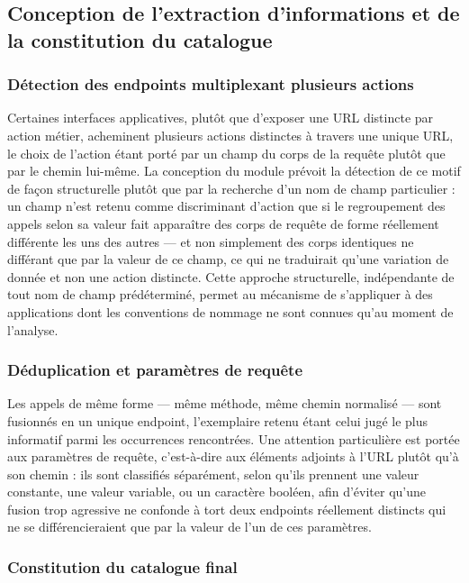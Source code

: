 \subsection{Conception de l'extraction d'informations et de la constitution du catalogue}

\subsubsection{Détection des endpoints multiplexant plusieurs actions}

Certaines interfaces applicatives, plutôt que d'exposer une URL distincte par action métier, acheminent plusieurs actions distinctes à travers une unique URL, le choix de l'action étant porté par un champ du corps de la requête plutôt que par le chemin lui-même. La conception du module prévoit la détection de ce motif de façon structurelle plutôt que par la recherche d'un nom de champ particulier : un champ n'est retenu comme discriminant d'action que si le regroupement des appels selon sa valeur fait apparaître des corps de requête de forme réellement différente les uns des autres — et non simplement des corps identiques ne différant que par la valeur de ce champ, ce qui ne traduirait qu'une variation de donnée et non une action distincte. Cette approche structurelle, indépendante de tout nom de champ prédéterminé, permet au mécanisme de s'appliquer à des applications dont les conventions de nommage ne sont connues qu'au moment de l'analyse.

\subsubsection{Déduplication et paramètres de requête}

Les appels de même forme — même méthode, même chemin normalisé — sont fusionnés en un unique endpoint, l'exemplaire retenu étant celui jugé le plus informatif parmi les occurrences rencontrées. Une attention particulière est portée aux paramètres de requête, c'est-à-dire aux éléments adjoints à l'URL plutôt qu'à son chemin : ils sont classifiés séparément, selon qu'ils prennent une valeur constante, une valeur variable, ou un caractère booléen, afin d'éviter qu'une fusion trop agressive ne confonde à tort deux endpoints réellement distincts qui ne se différencieraient que par la valeur de l'un de ces paramètres.

\subsubsection{Constitution du catalogue final}

